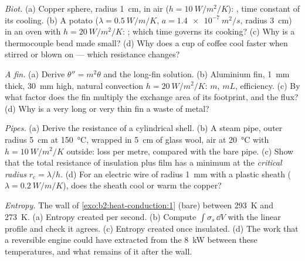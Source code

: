 \begin{exercise}[$\star\star$]\label{exo:b2:heat-conduction:7}
\emph{Biot.} (a) Copper sphere, radius \qty{1}{cm}, in air ($h =
\qty{10}{W/m^2/K}$): , time constant of its cooling. (b) A
potato ($\lambda = \qty{0.5}{W/m/K}$, $a = \qty{1.4e-7}{m^2/s}$, radius
\qty{3}{cm}) in an oven with $h = \qty{20}{W/m^2/K}$: ; which
time governs its cooking? (c) Why is a thermocouple bead made small?
(d) Why does a cup of coffee cool faster when stirred or blown on ---
which resistance changes?
\end{exercise}

\begin{exercise}[$\star\star$]\label{exo:b2:heat-conduction:8}
\emph{A fin.} (a) Derive $\theta'' = m^2\theta$ and the long-fin solution.
(b) Aluminium fin, \qty{1}{mm} thick, \qty{30}{mm} high, natural
convection $h = \qty{20}{W/m^2/K}$: $m$, $mL$, efficiency. (c) By what
factor does the fin multiply the exchange area of its footprint, and
the flux? (d) Why is a very long or very thin fin a waste of metal?
\end{exercise}

\begin{exercise}[$\star\star$]\label{exo:b2:heat-conduction:9}
\emph{Pipes.} (a) Derive the resistance of a cylindrical shell. (b) A
steam pipe, outer radius \qty{5}{cm} at \qty{150}{\celsius}, wrapped in
\qty{5}{cm} of glass wool, air at \qty{20}{\celsius} with $h =
\qty{10}{W/m^2/K}$ outside: loss per metre, compared with the bare pipe.
(c) Show that the total resistance of insulation plus film has a
minimum at the \emph{critical radius} $r_{\text{c}} = \lambda/h$. (d) For an
electric wire of radius \qty{1}{mm} with a plastic sheath ($\lambda =
\qty{0.2}{W/m/K}$), does the sheath cool or warm the copper?
\end{exercise}

\begin{exercise}[$\star\star\star$]\label{exo:b2:heat-conduction:10}
\emph{Entropy.} The wall of \cref{exo:b2:heat-conduction:1} (bare)
between \qty{293}{K} and \qty{273}{K}. (a) Entropy created per second.
(b) Compute $\int\sigma_s\,\dd V$ with the linear profile and check it
agrees. (c) Entropy created once insulated. (d) The work that a
reversible engine could have extracted from the \qty{8}{kW} between
these temperatures, and what remains of it after the wall.
\end{exercise}

